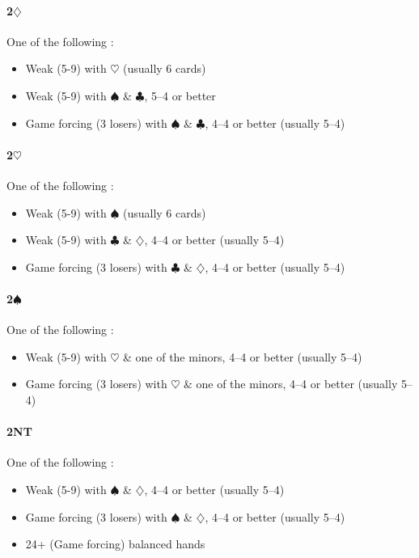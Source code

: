 \documentclass[a4paper,14pt]{extarticle}
\begin{document}
\paragraph{2$\diamondsuit$}
One of the following :
\begin{itemize}
\item Weak (5-9) with $\heartsuit$ (usually 6 cards)
\item Weak (5-9) with $\spadesuit$ \& $\clubsuit$, 5--4 or better 
\item Game forcing (3 losers) with $\spadesuit$ \& $\clubsuit$, 4--4 or better  (usually 5--4)
\end{itemize}

\paragraph{2$\heartsuit$}
One of the following :
\begin{itemize}
\item Weak (5-9) with $\spadesuit$ (usually 6 cards)
\item Weak (5-9) with $\clubsuit$ \& $\diamondsuit$, 4--4 or better (usually 5--4)
\item Game forcing (3 losers) with $\clubsuit$ \& $\diamondsuit$, 4--4 or better (usually 5--4)
\end{itemize}

\paragraph{2$\spadesuit$}
One of the following :
\begin{itemize}
\item Weak (5-9) with $\heartsuit$ \& one of the minors, 4--4 or better (usually 5--4)
\item Game forcing (3 losers) with $\heartsuit$ \& one of the minors, 4--4 or better (usually 5--4)
\end{itemize}

\paragraph{2NT}
One of the following :
\begin{itemize}
\item Weak (5-9) with $\spadesuit$ \& $\diamondsuit$, 4--4 or better (usually 5--4)
\item Game forcing (3 losers) with $\spadesuit$ \& $\diamondsuit$, 4--4 or better (usually 5--4)
\item 24+ (Game forcing) balanced hands
\end{itemize}
\end{document}
